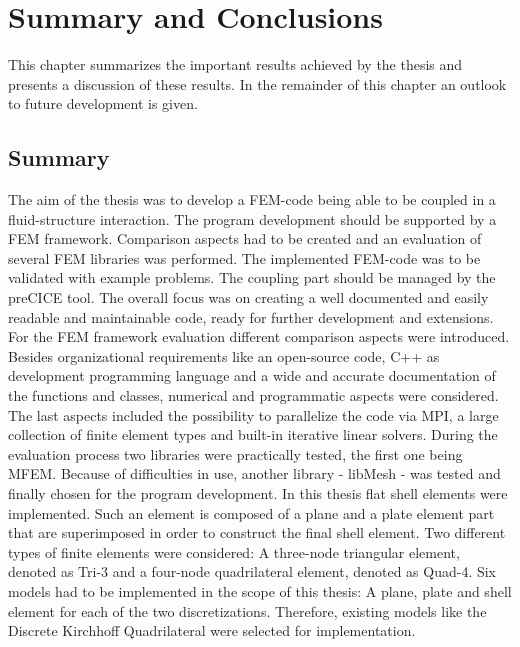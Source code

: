 \section{Summary and Conclusions}
 This chapter summarizes the important results achieved by the thesis and presents a discussion of these results. In the remainder of this chapter an outlook to future development is given.
 
 
 \subsection{Summary}
  The aim of the thesis was to develop a FEM-code being able to be coupled in a fluid-structure interaction. The program development should be supported by a FEM framework. Comparison aspects had to be created and an evaluation of several FEM libraries was performed. The implemented FEM-code was to be validated with example problems. The coupling part should be managed by the preCICE tool. The overall focus was on creating a well documented and easily readable and maintainable code, ready for further development and extensions.
  For the FEM framework evaluation different comparison aspects were introduced. Besides organizational requirements like an open-source code, C++ as development programming language and a wide and accurate documentation of the functions and classes, numerical and programmatic aspects were considered. The last aspects included the possibility to parallelize the code via MPI, a large collection of finite element types and built-in iterative linear solvers. During the evaluation process two libraries were practically tested, the first one being MFEM. Because of difficulties in use, another library - libMesh - was tested and finally chosen for the program development.  
  In this thesis flat shell elements were implemented. Such an element is composed of a plane and a plate element part that are superimposed in order to construct the final shell element. Two different types of finite elements were considered: A three-node triangular element, denoted as Tri-3 and a four-node quadrilateral element, denoted as Quad-4. Six models had to be implemented in the scope of this thesis: A plane, plate and shell element for each of the two discretizations. Therefore, existing models like the Discrete Kirchhoff Quadrilateral were selected for implementation.
